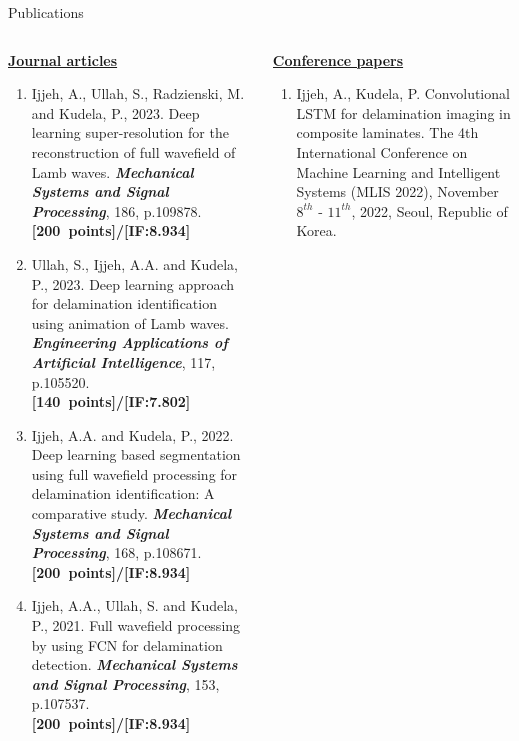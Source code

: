 \documentclass[10pt,aspectratio=169,dvipsnames]{beamer} %
\begin{document}
	\begin{frame}{Publications}
		\vspace{5pt}
		\addtolength{\leftmargini}{\labelsep}
		\begin{tiny}					
			\begin{columns}[T]
				\begin{column}[t]{0.48\textwidth}
					\underline{\textbf{Journal articles}}
					\begin{enumerate}
						\justifying
						\item Ijjeh, A., Ullah, S., Radzienski, M. and Kudela, P., 2023. Deep learning super-resolution for the reconstruction of full wavefield of Lamb waves. \textbf{\textit{Mechanical Systems and Signal Processing}}, 186, p.109878.						
						\textbf{[200~points]/[IF:8.934]}
						\item Ullah, S., Ijjeh, A.A. and Kudela, P., 2023. Deep learning approach for delamination identification using animation of Lamb waves. 						
						\textbf{\textit{Engineering Applications of Artificial Intelligence}}, 117, p.105520.		
						\textbf{[140~points]/[IF:7.802]}
						\item Ijjeh, A.A. and Kudela, P., 2022. Deep learning based segmentation using full wavefield processing for delamination identification: A comparative study. \textbf{\textit{Mechanical Systems and Signal Processing}}, 168, p.108671. \textbf{[200~points]/[IF:8.934]}
						\item Ijjeh, A.A., Ullah, S. and Kudela, P., 2021. Full wavefield processing by using FCN for delamination detection. \textbf{\textit{Mechanical Systems and Signal Processing}}, 153, p.107537.		
						\textbf{[200~points]/[IF:8.934]}	
					\end{enumerate}					
				\end{column}
				\begin{column}[t]{0.48\textwidth}
					\underline{\textbf{Conference papers}}
					\begin{enumerate}
						\justifying
						\item {Ijjeh, A.}, Kudela, P. Convolutional LSTM for delamination imaging in composite laminates. 
						The 4th International Conference on Machine Learning and Intelligent Systems (MLIS 2022), November \(8^{th}\) - \(11^{th}\), 2022, Seoul, Republic of Korea.

\end{enumerate}
\end{column}
\end{columns}
\end{tiny}
\end{frame}
\end{document}
